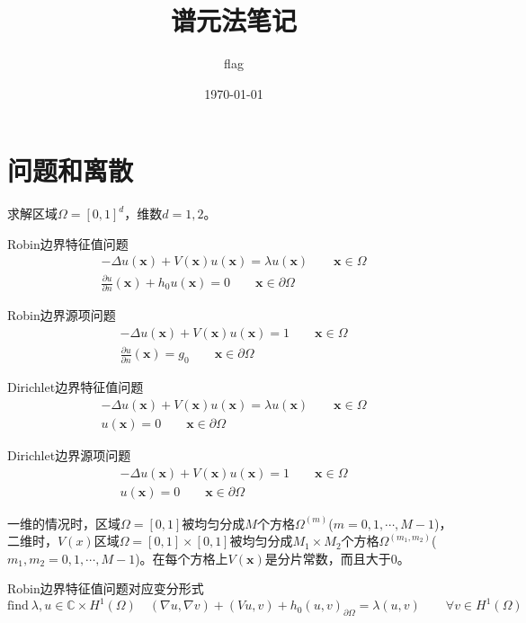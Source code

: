 \documentclass[UTF8,12pt]{article}
\title{谱元法笔记}
\author{flag}
\date{\today}
\begin{document}
\maketitle

\section{问题和离散}

求解区域$\Omega = [0,1]^d$，维数$d = 1, 2$。

Robin边界特征值问题
\begin{eqnarray}
- \Delta u(\mathbf{x}) + V(\mathbf{x}) u(\mathbf{x}) = \lambda u(\mathbf{x}) \qquad \mathbf{x} \in \Omega \\
\frac{\partial u}{\partial n}(\mathbf{x}) + h_0 u(\mathbf{x}) = 0 \qquad \mathbf{x} \in \partial \Omega
\end{eqnarray}

Robin边界源项问题
\begin{eqnarray}
- \Delta u(\mathbf{x}) + V(\mathbf{x}) u(\mathbf{x}) = 1 \qquad \mathbf{x} \in \Omega \\
\frac{\partial u}{\partial n}(\mathbf{x}) = g_0 \qquad \mathbf{x} \in \partial \Omega
\end{eqnarray}

Dirichlet边界特征值问题
\begin{eqnarray}
- \Delta u(\mathbf{x}) + V(\mathbf{x}) u(\mathbf{x}) = \lambda u(\mathbf{x}) \qquad \mathbf{x} \in \Omega \\
u(\mathbf{x}) = 0 \qquad \mathbf{x} \in \partial \Omega
\end{eqnarray}

Dirichlet边界源项问题
\begin{eqnarray}
- \Delta u(\mathbf{x}) + V(\mathbf{x}) u(\mathbf{x}) = 1 \qquad \mathbf{x} \in \Omega \\
u(\mathbf{x}) = 0 \qquad \mathbf{x} \in \partial \Omega
\end{eqnarray}

一维的情况时，区域$\Omega=[0,1]$被均匀分成$M$个方格$\Omega^{(m)}$($m = 0, 1, \cdots, M-1$)，二维时，$V(x)$区域$\Omega=[0,1] \times [0,1]$被均匀分成$M_1 \times M_2$个方格$\Omega^{(m_1, m_2)}$($m_1, m_2 = 0, 1, \cdots, M-1$)。在每个方格上$V(\mathbf{x})$是分片常数，而且大于0。

Robin边界特征值问题对应变分形式
\begin{equation}
\text{find} \ \lambda, u \in \mathbb{C} \times H^1(\Omega) \quad (\nabla u, \nabla v) + (V u, v) + h_0 (u, v)_{\partial\Omega} = \lambda (u, v) \qquad \forall v \in  H^1(\Omega)
\end{equation}
\end{document}
